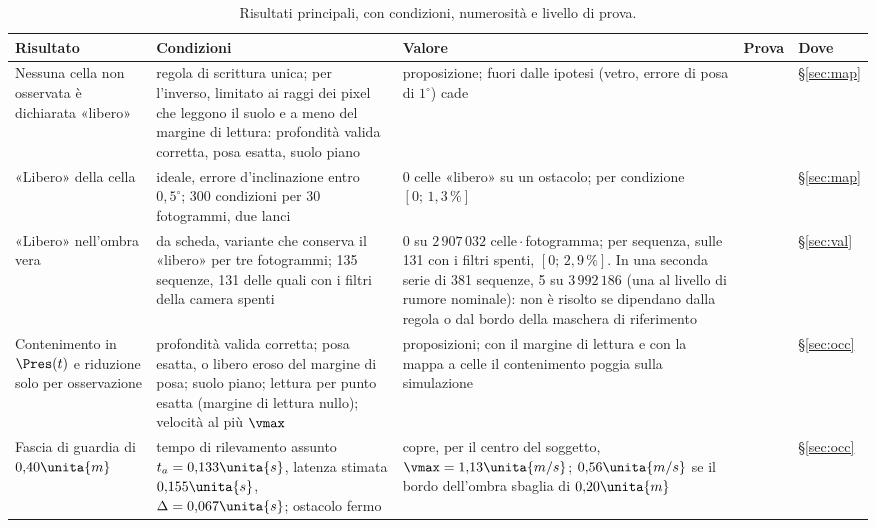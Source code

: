 \begin{table}[p]
\centering\footnotesize
\setlength{\tabcolsep}{4pt}
\caption{Risultati principali, con condizioni, numerosità e livello di prova.}\label{tab:intro-sintesi}
\begin{tabularx}{\textwidth}{@{}>{\RaggedRight\arraybackslash}p{2.8cm}>{\RaggedRight\arraybackslash}p{4.1cm}L>{\RaggedRight\arraybackslash}p{1.2cm}>{\RaggedRight\arraybackslash}p{1.05cm}@{}}
\toprule
Risultato & Condizioni & Valore & Prova & Dove\\
\midrule
Nessuna cella non osservata è dichiarata «libero» & regola di scrittura unica; per l'inverso, limitato ai raggi dei pixel che leggono il suolo e a meno del margine di lettura: profondità valida corretta, posa esatta, suolo piano & proposizione; fuori dalle ipotesi (vetro, errore di posa di $1^\circ$) cade &  & \S\ref{sec:map}\\
«Libero» della cella & ideale, errore d'inclinazione entro $0{,}5^\circ$; 300 condizioni per 30 fotogrammi, due lanci & 0 celle «libero» su un ostacolo; per condizione $[0;\,1{,}3\,\%]$ &  & \S\ref{sec:map}\\
«Libero» nell'ombra vera & da scheda, variante che conserva il «libero» per tre fotogrammi; 135 sequenze, 131 delle quali con i filtri della camera spenti & 0 su $2\,907\,032$ celle\,$\cdot$\,fotogramma; per sequenza, sulle 131 con i filtri spenti, $[0;\,2{,}9\,\%]$. In una seconda serie di 381 sequenze, 5 su $3\,992\,186$ (una al livello di rumore nominale): non è risolto se dipendano dalla regola o dal bordo della maschera di riferimento &  & \S\ref{sec:val}\\
Contenimento in $\Pres(t)$ e riduzione solo per osservazione & profondità valida corretta; posa esatta, o libero eroso del margine di posa; suolo piano; lettura per punto esatta (margine di lettura nullo); velocità al più $\vmax$ & proposizioni; con il margine di lettura e con la mappa a celle il contenimento poggia sulla simulazione &  & \S\ref{sec:occ}\\
Fascia di guardia di $0{,}40\unita{m}$ & tempo di rilevamento assunto $t_a=0{,}133\unita{s}$, latenza stimata $0{,}155\unita{s}$, $\Delta=0{,}067\unita{s}$; ostacolo fermo & copre, per il centro del soggetto, $\vmax=1{,}13\unita{m/s}$; $0{,}56\unita{m/s}$ se il bordo dell'ombra sbaglia di $0{,}20\unita{m}$ &  & \S\ref{sec:occ}\\

\end{tabularx}
\end{table}
